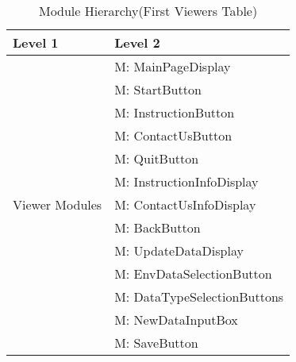 \documentclass[12pt, titlepage]{article}
\newcounter{mnum}
\newcommand{\mthemnum}{M\themnum}
\begin{document}
\newpage

\begin{table}[H]
\caption{Module Hierarchy(First Viewers Table)}
\label{TblViewers1}

\centering
\begin{tabular}{p{} p{}}
\toprule
\textbf{Level 1} & \textbf{Level 2}\\
\midrule

\multirow{13}{0.3\textwidth}{Viewer Modules}
& {mnum} \mthemnum \label{Viwer1}: MainPageDisplay \\
& {mnum} \mthemnum \label{Viwer2}: StartButton \\
& {mnum} \mthemnum \label{Viwer3}: InstructionButton \\
& {mnum} \mthemnum \label{Viwer4}: ContactUsButton \\
& {mnum} \mthemnum \label{Viwer5}: QuitButton \\
& {mnum} \mthemnum \label{Viwer6}: InstructionInfoDisplay \\
& {mnum} \mthemnum \label{Viwer7}: ContactUsInfoDisplay \\ 
& {mnum} \mthemnum \label{Viwer8}: BackButton \\
& {mnum} \mthemnum \label{Viwer9}: UpdateDataDisplay \\
& {mnum} \mthemnum \label{Viwer10}: EnvDataSelectionButton \\
& {mnum} \mthemnum \label{Viwer11}: DataTypeSelectionButtons \\
& {mnum} \mthemnum \label{Viwer12}: NewDataInputBox \\
& {mnum} \mthemnum \label{Viwer13}: SaveButton \\
\bottomrule
\end{tabular}
\end{table}

\newpage
\end{document}
